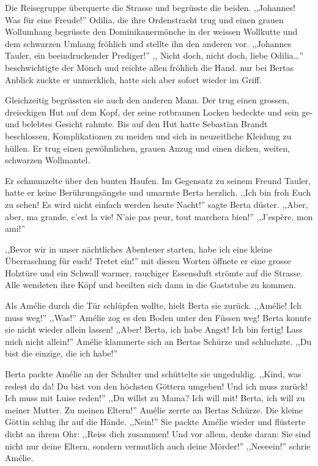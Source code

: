 Die Reisegruppe überquerte die Strasse und begrüsste die beiden. ,,Johannes! Was für eine Freude!'' Odilia, die ihre Ordenstracht trug und einen grauen Wollumhang begrüsste den Dominikanermönche in der weissen Wollkutte und dem schwarzen Umhang fröhlich und stellte ihn den anderen vor. ,,Johannes Tauler, ein beeindruckender Prediger!'' ,, Nicht doch, nicht doch, liebe Odilia\dots '' beschwichtigte der Mönch und reichte allen fröhlich die Hand. nur bei Bertas Anblick zuckte er unmerklich, hatte sich aber sofort wieder im Griff.

Gleichzeitig begrüssten sie auch den anderen Mann. Der trug einen grossen, dreieckigen Hut auf dem Kopf, der seine rotbraunen Locken bedeckte und sein ge- und belebtes Gesicht rahmte. Bis auf den Hut hatte Sebastian Brandt beschlossen, Komplikationen zu meiden und sich in neuzeitliche Kleidung zu hüllen. Er trug einen gewöhnlichen, grauen Anzug und einen dicken, weiten, schwarzen Wollmantel. 

Er schmunzelte über den bunten Haufen. Im Gegensatz zu seinem Freund Tauler, hatte er keine Berührungsängste und umarmte Berta herzlich. ,,Ich bin froh Euch zu sehen! Es wird nicht einfach werden heute Nacht!'' sagte Berta düster. ,,Aber, aber, ma grande, c'est la vie! N'aie pas peur, tout marchera bien!'' ,,J'espère, mon ami!''

,,Bevor wir in unser nächtliches Abenteuer starten, habe ich eine kleine Überraschung für euch! Tretet ein!'' mit diesen Worten öffnete er eine grosse Holztüre und ein Schwall warmer, rauchiger Essensduft strömte auf die Strasse. Alle wendeten ihre Köpf und beeilten sich dann in die Gaststube zu kommen.

Als Amélie durch die Tür schlüpfen wollte, hielt Berta sie zurück. ,,Amélie! Ich muss weg!'' ,,Was!'' Amélie zog es den Boden unter den Füssen weg! Berta konnte sie nicht wieder allein lassen! ,,Aber! Berta, ich habe Angst! Ich bin fertig! Lass mich nicht allein!'' Amélie klammerte sich an Bertas Schürze und schluchzte. ,,Du bist die einzige, die ich habe!''

Berta packte Amélie an der Schulter und schüttelte sie ungeduldig. ,,Kind, was redest du da! Du bist von den höchsten Göttern umgeben! Und ich muss zurück! Ich muss mit Luise reden!'' ,,Du willst zu Mama? Ich will mit! Berta, ich will zu meiner Mutter. Zu meinen Eltern!'' Amélie zerrte an Bertas Schürze. Die kleine Göttin schlug ihr auf die Hände. ,,Nein!'' Sie packte Amélie wieder und flüsterte dicht an ihrem Ohr: ,,Reiss dich zusammen! Und vor allem, denke daran: Sie sind nicht nur deine Eltern, sondern vermutlich auch deine Mörder!'' ,,Neeeein!'' schrie Amélie. 


